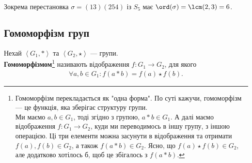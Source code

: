 \documentclass{math_library}
\begin{document}
\begin{example}
Зокрема перестановка $\sigma = (13) (254)$ із $S_5$ має $\ord(\sigma) = \lcm(2,3) = 6$.
\end{example}

\subsection{Гомоморфізм груп}
\begin{definition}
Нехай $\left<G_1, * \right>$ та $\left<G_2, \star \right>$ --- групи.\\
\textbf{Гомоморфізмом}\footnote{Гомоморфізм перекладається як "одна форма". По суті кажучи, гомоморфізм --- це функція, яка зберігає структуру групи.\\
Ми маємо $a,b \in G_1$, тоді згідно з групою, $a*b \in G_1$. А далі маємо відображення $f \colon G_1 \to G_2$, куди ми переводимось в іншу групу, з іншою операцією. Ці три елементи можна засунути в відображення та отримати $f(a), f(b) \in G_2$, а також $f(a*b) \in G_2$. Ясно, що $f(a) \star f(b) \in G_2$, але додатково хотілось б, щоб це збігалось з $f(a*b)$.} називають відображення $f \colon G_1 \to G_2$, для якого
\begin{align*}
\forall a,b \in G_1: f(a*b) = f(a) \star f(b).
\end{align*}
\end{definition}
\end{document}
